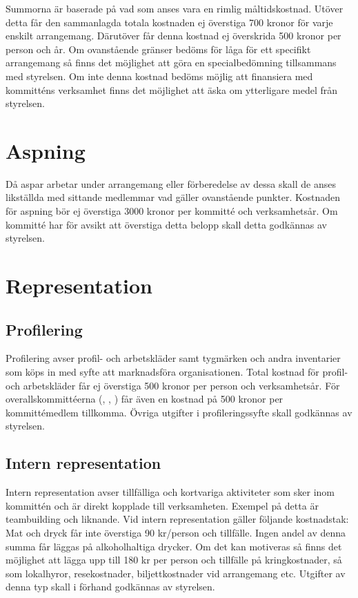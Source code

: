 \documentclass[11pt, includeaddress]{classes/cthit}
\begin{document}
\addvbuffer[\the\baselineskip]{\begin{tabular}{ l  c  c  c  c}
	\centering
	Timmar & [0-5) & (5-9] & (9-13] & (13-24] \\
	\hline
	Kronor & 0 & 30 & 60 & 90 \\
\end{tabular}}

Summorna är baserade på vad som anses vara en rimlig måltidskostnad. Utöver detta får den sammanlagda totala kostnaden ej överstiga 700 kronor för varje enskilt arrangemang. Därutöver får denna kostnad ej överskrida 500 kronor per person och år. Om ovanstående gränser bedöms för låga för ett specifikt arrangemang så finns det möjlighet att göra en specialbedömning tillsammans med styrelsen. Om inte denna kostnad bedöms möjlig att finansiera med kommitténs verksamhet finns det möjlighet att äska om ytterligare medel från styrelsen. 


\section{Aspning}
Då aspar arbetar under arrangemang eller förberedelse av dessa skall de anses likställda med sittande medlemmar vad gäller ovanstående punkter. Kostnaden för aspning bör ej överstiga 3000 kronor per kommitté och verksamhetsår. Om kommitté har för avsikt att överstiga detta belopp skall detta godkännas av styrelsen.


\section{Representation}

\subsection{Profilering}
Profilering avser profil- och arbetskläder samt tygmärken och andra inventarier som köps in med syfte att marknadsföra organisationen. Total kostnad för profil- och arbetskläder får ej överstiga 500 kronor per person och verksamhetsår. För overallskommittéerna (\NOLLKIT, \PRIT, \SEXIT) får även en kostnad på 500 kronor per kommittémedlem tillkomma. Övriga utgifter i profileringssyfte skall godkännas av styrelsen. 

\subsection{Intern representation}
Intern representation avser tillfälliga och kortvariga aktiviteter som sker inom kommittén och är direkt kopplade till verksamheten. Exempel på detta är teambuilding och liknande. Vid intern representation gäller följande kostnadstak: Mat och dryck får inte överstiga 90 kr/person och tillfälle. Ingen andel av denna summa får läggas på alkoholhaltiga drycker. Om det kan motiveras så finns det möjlighet att lägga upp till 180 kr per person och tillfälle på kringkostnader, så som lokalhyror, resekostnader, biljettkostnader vid arrangemang etc. Utgifter av denna typ skall i förhand godkännas av styrelsen.
\end{document}
